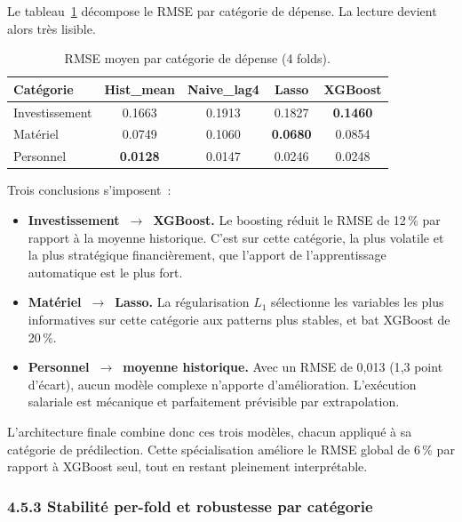 Le tableau~\ref{tab:bycat} d\'ecompose le RMSE par cat\'egorie de d\'epense.
La lecture devient alors tr\`es lisible.

\begin{table}[H]
\centering\small
\caption{RMSE moyen par cat\'egorie de d\'epense (4 folds).}
\label{tab:bycat}
\begin{tabular}{@{}lcccc@{}}
\toprule
\textbf{Cat\'egorie} & \textbf{Hist\_mean} & \textbf{Naive\_lag4} & \textbf{Lasso} & \textbf{XGBoost} \\
\midrule
Investissement & 0.1663 & 0.1913 & 0.1827 & \textbf{0.1460} \\
Mat\'eriel     & 0.0749 & 0.1060 & \textbf{0.0680} & 0.0854 \\
Personnel      & \textbf{0.0128} & 0.0147 & 0.0246 & 0.0248 \\
\bottomrule
\end{tabular}
\end{table}

\noindent
Trois conclusions s'imposent~:

\begin{itemize}
    \item \textbf{Investissement~$\rightarrow$~XGBoost.} Le boosting r\'eduit le RMSE
    de 12\,\% par rapport \`a la moyenne historique. C'est sur cette cat\'egorie,
    la plus volatile et la plus strat\'egique financi\`erement, que l'apport de
    l'apprentissage automatique est le plus fort.

    \item \textbf{Mat\'eriel~$\rightarrow$~Lasso.} La r\'egularisation $L_1$ s\'electionne
    les variables les plus informatives sur cette cat\'egorie aux patterns plus
    stables, et bat XGBoost de 20\,\%.

    \item \textbf{Personnel~$\rightarrow$~moyenne historique.} Avec un RMSE de 0{,}013
    (1{,}3 point d'\'ecart), aucun mod\`ele complexe n'apporte d'am\'elioration.
    L'ex\'ecution salariale est m\'ecanique et parfaitement pr\'evisible par extrapolation.
\end{itemize}

\noindent
L'architecture finale combine donc ces trois mod\`eles, chacun appliqu\'e \`a sa
cat\'egorie de pr\'edilection. Cette sp\'ecialisation am\'eliore le RMSE global
de 6\,\% par rapport \`a XGBoost seul, tout en restant pleinement interpr\'etable.

\subsubsection*{4.5.3 \quad Stabilit\'e per-fold et robustesse par cat\'egorie}

